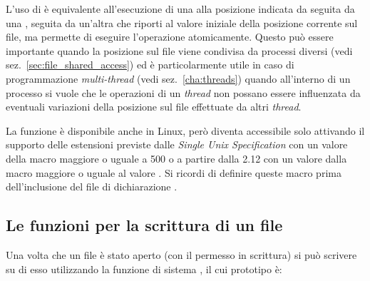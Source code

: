 L'uso di  è equivalente all'esecuzione di una  alla
posizione indicata da  seguita da una , seguita da
un'altra  che riporti al valore iniziale della posizione corrente
sul file, ma permette di eseguire l'operazione atomicamente. Questo può essere
importante quando la posizione sul file viene condivisa da processi diversi
(vedi sez.~\ref{sec:file_shared_access}) ed è particolarmente utile in caso di
programmazione \textit{multi-thread} (vedi sez.~\ref{cha:threads}) quando
all'interno di un processo si vuole che le operazioni di un \textit{thread}
non possano essere influenzata da eventuali variazioni della posizione sul
file effettuate da altri \textit{thread}.

La funzione  è disponibile anche in Linux, però diventa
accessibile solo attivando il supporto delle estensioni previste dalle
\textit{Single Unix Specification} con un valore della macro
 maggiore o uguale a 500 o a partire dalla 
2.12 con un valore dalla macro  maggiore o uguale al
valore .  Si ricordi di definire queste macro prima
dell'inclusione del file di dichiarazione .


\subsection{Le funzioni per la scrittura di un file}
\label{sec:file_write}

Una volta che un file è stato aperto (con il permesso in scrittura) si può
scrivere su di esso utilizzando la funzione di sistema , il cui
prototipo è:

